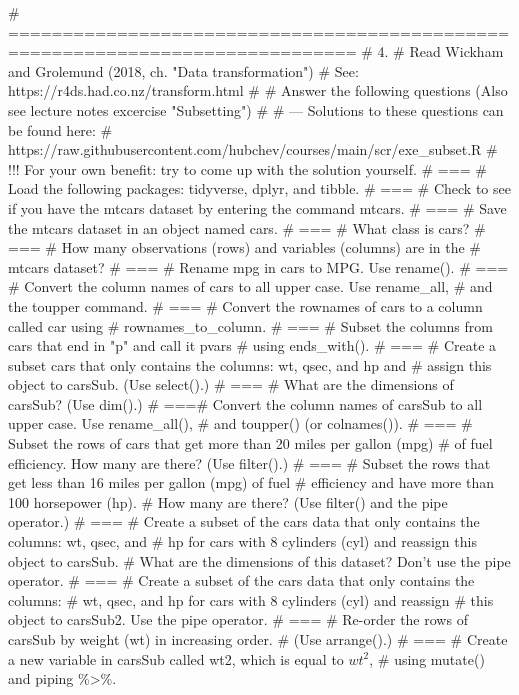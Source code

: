 \begin{rblock1}
# ==============================================================================
# 4. 
# Read Wickham and Grolemund (2018, ch. "Data transformation") 
# See: https://r4ds.had.co.nz/transform.html
# 
# Answer the following questions (Also see lecture notes excercise "Subsetting")
# 
# --- Solutions to these questions can be found here:
# https://raw.githubusercontent.com/hubchev/courses/main/scr/exe_subset.R
# !!! For your own benefit: try to come up with the solution yourself.  
# ===
# Load the following packages: tidyverse, dplyr, and tibble.
# ===
# Check to see if you have the mtcars dataset by entering the command mtcars.
# ===
# Save the mtcars dataset in an object named cars.
# ===
# What class is cars?
# ===
# How many observations (rows) and variables (columns) are in the 
# mtcars dataset?
# ===
# Rename mpg in cars to MPG. Use rename().
# ===
# Convert the column names of cars to all upper case. Use rename\_all, 
# and the toupper command.
# ===
# Convert the rownames of cars to a column called car using 
# rownames\_to\_column. 
# ===
# Subset the columns from cars that end in "p" and call it pvars 
# using ends\_with().
# ===
# Create a subset cars that only contains the columns: wt, qsec, and hp and 
# assign this object to carsSub.  (Use select().)
# ===
# What are the dimensions of carsSub? (Use dim().)
# ===# Convert the column names of carsSub to all upper case. Use rename\_all(), 
# and toupper() (or colnames()).
# ===
# Subset the rows of cars that get more than 20 miles per gallon (mpg) 
# of fuel efficiency. How many are there? (Use filter().)
# ===
# Subset the rows that get less than 16 miles per gallon (mpg) of fuel 
# efficiency and have more than 100 horsepower (hp). 
# How many are there? (Use filter() and the pipe operator.)
# ===
# Create a subset of the cars data that only contains the columns: wt, qsec, and
# hp for cars with 8 cylinders (cyl) and reassign this object to carsSub. 
# What are the dimensions of this dataset? Don't use the pipe operator.
# ===
# Create a subset of the cars data that only contains the columns: 
# wt, qsec, and hp for cars with 8 cylinders (cyl) and reassign 
# this object to carsSub2. Use the pipe operator.
# ===
# Re-order the rows of carsSub by weight (wt) in increasing order. 
# (Use arrange().)
# ===
# Create a new variable in carsSub called wt2, which is equal to $wt^2$, 
# using mutate() and piping \%>\%.


\end{rblock1}
